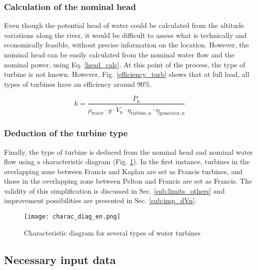 \subsubsection{Calculation of the nominal head}
\label{sub:extrapol_h_n}

Even though the potential head of water could be calculated from the altitude variations along the river, it would be difficult to assess what is technically and economically feasible, without precise information on the location. However, the nominal head can be easily calculated from the nominal water flow and the nominal power, using Eq. \eqref{head_calc}. At this point of the process, the type of turbine is not known. However, Fig. \ref{efficiency_turb} shows that at full load, all types of turbines have an efficiency around 90\%.

\begin{equation}
\label{head_calc} 
 h = \frac{P_\mathrm{n}}{\rho_\mathrm{water} \cdot g \cdot \dot{V}_\mathrm{n} \cdot \eta_\mathrm{turbine,n} \cdot \eta_\mathrm{generator,n}}
\end{equation}

\subsubsection{Deduction of the turbine type}
Finally, the type of turbine is deduced from the nominal head and nominal water flow using a characteristic diagram (Fig. \ref{charac_diag}).  In  the first instance, turbines in the overlapping zone between Francis and Kaplan are set as Francis turbines, and those in the overlapping zone between Pelton and Francis are set as Francis. The validity of this simplification is discussed in Sec. \ref{sub:limits_others} and improvement possibilities are presented in Sec. \ref{sub:imp_dVn}.

\begin{figure}[H]
\centering
\texttt{[image: charac\_diag\_en.png]}
\caption[Characteristic diagram for several types of water turbines]{Characteristic diagram for several types of water turbines \cite{wiki_WK}}
\label{charac_diag}
\end{figure}

\subsection{Necessary input data}
\label{sub:collec_data}

